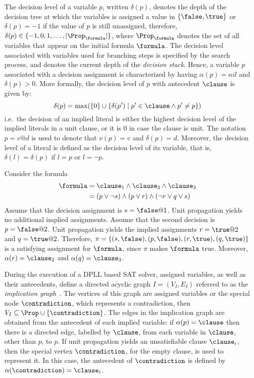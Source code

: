 The decision level of a variable $p$, written $\delta(p)$, denotes the depth of
the decision tree at which the variables is assigned a value in $\{\false,
\true\}$ or $\delta(p) = -1$ if the value of $p$ is still unassigned, therefore,
$\delta(p) \in \{-1, 0, 1, \ldots, |\Prop_\formula|\}$, where $\Prop_\formula$
denotes the set of all variables that appear on the initial formula $\formula$.
The decision level associated with variables used for branching steps is
specified by the search process, and denotes the current depth of the
\emph{decision stack}.  Hence, a variable $p$ associated with a decision
assignment is characterized by having $\alpha(p) = nil$ and $\delta(p) > 0$.
More formally, the decision level of $p$ with antecedent $\clause$ is given by: 
\begin{equation}
    \delta(p) = \max(\{0\} \cup \{\delta(p') \mid p' \in \clause \land p' \neq p\})
\end{equation}
i.e.\ the decision of an implied literal is either the highest decision level of
the implied literals in a unit clause, or it is 0 in case the clause is unit.
The notation $p = v @ d$ is used to denote that $\nu(p) = v$ and $\delta(p) =
d$. Moreover, the decision level of a literal is defined as the decision level
of its variable, that is, $\delta(l) = \delta(p)$ if $l = p$ or $l = \neg p$.

\begin{example}
    Consider the formula 
    \begin{align*}
        \formula & = \clause_1 \land \clause_2 \land \clause_3\\
                 & = (p \lor \neg s) \land (p \lor r) \land (\neg r \lor q \lor s)
    \end{align*}
    Assume that the decision assignment is $s = \false @ 1$. Unit propagation
    yields no additional implied assignments. Assume that the second decision is
    $p = \false @ 2$. Unit propagation yields the implied assignments $r = \true
    @ 2$ and $q = \true @ 2$. Therefore, $\pi = \{(s, \false), (p, \false), (r,
    \true), (q, \true)\}$ is a satisfying assignment for $\formula$, since $\pi$
    makes $\formula$ true. Moreover, $\alpha(r) = \clause_2$ and $\alpha(q) =
    \clause_3$.
\end{example}

During the execution of a DPLL based SAT solver, assigned variables, as well as
their antecedents, define a directed acyclic graph $I = (V_I, E_I)$ referred to
as the \emph{implication graph}~\cite{silva1997grasp}. The vertices of this
graph are assigned variables or the special node $\contradiction$, which
represents a contradiction, then $V_I \subseteq \Prop \cup \{\contradiction\}$.
The edges in the implication graph are obtained from the antecedent of each
implied variable: if $\alpha(p) = \clause$ then there is a directed edge,
labelled by $\clause$, from each variable in $\clause$, other than $p$, to $p$.
If unit propagation yields an unsatisfiable clause $\clause_i$, then the special
vertex $\contradiction$, for the empty clause, is used to represent it. In this
case, the antecedent of $\contradiction$ is defined by $\alpha(\contradiction) =
\clause_i$.


